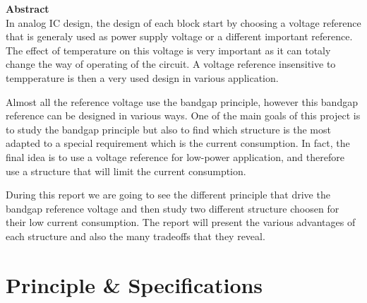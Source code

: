 \documentclass[11pt,a4paper]{report}
\begin{document}

{}
\renewcommand{\contentsname}{Sommaire}
\tableofcontents


\begin{minipage}{\textwidth}
  \listoffigures
  \listoftables
\end{minipage}

\newpage

\vspace{3cm}
\textbf{Abstract} \\
\newline
\hspace*{17pt} In analog IC design, the design of each block start by choosing a voltage reference that is generaly used as power supply voltage or a different important reference. The effect of temperature on this voltage is very important as it can totaly change the way of operating of the circuit. A voltage reference insensitive to tempperature is then a very used design in various application.

Almost all the reference voltage use the bandgap principle, however this bandgap reference can be designed in various ways. One of the main goals of this project is to study the bandgap principle but also to find which structure is the most adapted to a special requirement which is the current consumption.
In fact, the final idea is to use a voltage reference for low-power application, and therefore use a structure that will limit the current consumption.

During this report we are going to see the different principle that drive the bandgap reference voltage and then study two different structure choosen for their low current consumption. The report will present the various advantages of each structure and also the many tradeoffs that they reveal.



\newpage


\chapter{Principle \& Specifications}
\end{document}
